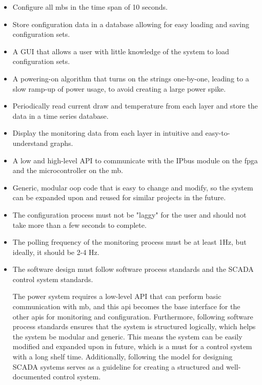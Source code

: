 \documentclass[main.tex]{subfiles}
\begin{document}
\begin{itemize}
    \item Configure all \gls{mb}s in the time span of 10 seconds. 
    \item Store configuration data in a database allowing for easy loading and saving configuration sets.
    \item A GUI that allows a user with little knowledge of the system to load configuration sets.
    \item A powering-on algorithm that turns on the strings one-by-one, leading to a slow ramp-up of power usage, to avoid creating a large power spike.
    \item Periodically read current draw and temperature from each layer and store the data in a time series database.
    \item Display the monitoring data from each layer in intuitive and easy-to-understand graphs.
    \item A low and high-level API to communicate with the IPbus module on the \gls{fpga} and the microcontroller on the \gls{mb}.
    \item Generic, modular \acrlong{oop} code that is easy to change and modify, so the system can be expanded upon and reused for similar projects in the future.
    \item The configuration process must not be "laggy" for the user and should not take more than a few seconds to complete.
    \item  The polling frequency of the monitoring process must be at least 1Hz, but ideally, it should be 2-4 Hz.
    \item The software design must follow software process standards and the SCADA control system standards.
    
The power system requires a low-level API that can perform basic communication with \gls{mb}, and this \gls{api} becomes the base interface for the other \gls{api}s for monitoring and configuration. Furthermore, following software process standards ensures that the system is structured logically, which helps the system be modular and generic. This means the system can be easily modified and expanded upon in future, which is a must for a control system with a long shelf time. Additionally, following the model for designing SCADA systems serves as a guideline for creating a structured and well-documented control system.
    
    
\end{itemize}

\newpage
\end{document}
